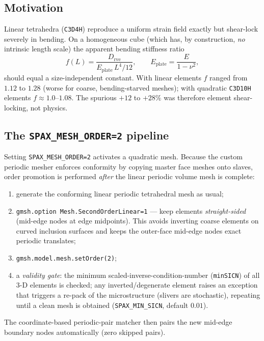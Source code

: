 \documentclass[11pt]{article}
\newcommand{\code}[1]{\texttt{\small #1}}
\newcommand{\env}[1]{\texttt{\small #1}}
\begin{document}
\subsection{Motivation}
Linear tetrahedra (\code{C3D4H}) reproduce a uniform strain field exactly but
shear-lock severely in bending. On a homogeneous cube (which has, by
construction, \emph{no} intrinsic length scale) the apparent bending stiffness
ratio
\begin{equation}
  f(L)=\frac{D_\text{rve}}{E_\text{plate}\,L^4/12},
  \qquad E_\text{plate}=\frac{E}{1-\nu^2},
\end{equation}
should equal a size-independent constant. With linear elements $f$ ranged from
$1.12$ to $1.28$ (worse for coarse, bending-starved meshes); with quadratic
\code{C3D10H} elements $f\!\approx\!1.0$--$1.08$. The spurious $+12$ to $+28\%$
was therefore element shear-locking, not physics.

\subsection{The \code{SPAX\_MESH\_ORDER=2} pipeline}
Setting \env{SPAX\_MESH\_ORDER=2} activates a quadratic mesh. Because the custom
periodic mesher enforces conformity by copying master face meshes onto slaves,
order promotion is performed \emph{after} the linear periodic volume mesh is
complete:
\begin{enumerate}[nosep]
  \item generate the conforming linear periodic tetrahedral mesh as usual;
  \item \code{gmsh.option Mesh.SecondOrderLinear=1} --- keep elements
        \emph{straight-sided} (mid-edge nodes at edge midpoints). This avoids
        inverting coarse elements on curved inclusion surfaces and keeps the
        outer-face mid-edge nodes exact periodic translates;
  \item \code{gmsh.model.mesh.setOrder(2)};
  \item a \emph{validity gate}: the minimum scaled-inverse-condition-number
        (\code{minSICN}) of all 3-D elements is checked; any inverted/degenerate
        element raises an exception that triggers a re-pack of the
        microstructure (slivers are stochastic), repeating until a clean mesh is
        obtained (\env{SPAX\_MIN\_SICN}, default $0.01$).
\end{enumerate}
The coordinate-based periodic-pair matcher then pairs the new mid-edge boundary
nodes automatically (zero skipped pairs).
\end{document}
